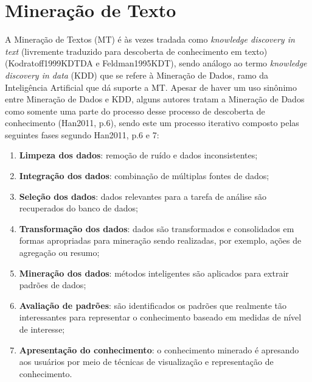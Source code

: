 \section{Mineração de Texto} \label{sec:MineraçãoTexto}
A Mineração de Textos (MT) é às vezes tradada como \textit{knowledge discovery in text} (livremente traduzido para descoberta de conhecimento em texto) (Kodratoff1999KDTDA e Feldman1995KDT), sendo análogo ao termo \textit{knowledge discovery in data} (KDD) que se refere à Mineração de Dados, ramo da Inteligência Artificial que dá suporte a MT. 
Apesar de haver um uso sinônimo entre Mineração de Dados e KDD, alguns autores tratam a Mineração de Dados como somente uma parte do processo desse processo de descoberta de conhecimento (Han2011, p.6), sendo este um processo iterativo composto pelas seguintes fases segundo Han2011, p.6 e 7:
\begin{enumerate}
    \item \textbf{Limpeza dos dados}: remoção de ruído e dados inconsistentes;
    \item \textbf{Integração dos dados}: combinação de múltiplas fontes de dados;
    \item \textbf{Seleção dos dados}: dados relevantes para a tarefa de análise são recuperados do banco de dados;
    \item \textbf{Transformação dos dados}: dados são transformados e consolidados em formas apropriadas para mineração sendo realizadas, por exemplo, ações de agregação ou resumo;
    \item \textbf{Mineração dos dados}: métodos inteligentes são aplicados para extrair padrões de dados;
    \item \textbf{Avaliação de padrões}: são identificados os padrões que realmente tão interessantes para representar o conhecimento baseado em medidas de nível de interesse;
    \item \textbf{Apresentação do conhecimento}: o conhecimento minerado é apresando aos usuários por meio de técnicas de visualização e representação de conhecimento.
\end{enumerate}


